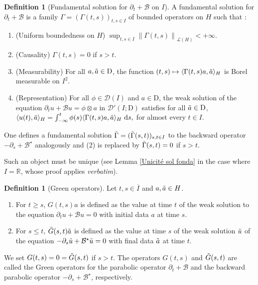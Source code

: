 \documentclass[11pt, letterpaper]{amsart}
\theoremstyle{definition}
\newtheorem{defn}[thm]{Definition}
\theoremstyle{remark}
\numberwithin{equation}{section}
\begin{document}
\begin{defn}[Fundamental solution for $\partial_t + \mathcal{B}$ on $I$] \label{FSintro}
    A fundamental solution for $\partial_t + \mathcal{B}$ is a family $\Gamma=(\Gamma(t,s))_{t,s \in I}$ of bounded operators on $H$ such that : 
    \begin{enumerate}
        \item (Uniform boundedness on $H$) $\sup_{t,s \in I} \left\|\Gamma(t,s) \right\|_{\mathcal{L}(H)} < +\infty.$
        \item (Causality) $\Gamma(t,s)=0$ if $s>t$.
        \item (Measurability) For all $a,\Tilde{a}\in  \mathrm{D}$, the function $(t,s) \mapsto \langle \Gamma(t,s)a, \Tilde{a} \rangle_H$ is Borel measurable on $I^2$.
        \item (Representation) For all $\phi \in \mathcal{D}(I)$ and $a \in  \mathrm{D}$, the weak solution of the equation $\partial_t u + \mathcal{B}u = \phi \otimes a $ in $\mathcal{D}'(I; \mathrm{D})$ satisfies for  all $\Tilde{a} \in  \mathrm{D}$,  $\langle u(t), \Tilde{a} \rangle_H = \int_{-\infty}^{t} \phi(s) \langle \Gamma (t,s)a, \Tilde{a} \rangle_H \ \mathrm{d}s,$ for almost every $t\in I$.
    \end{enumerate}
    One defines a fundamental solution $\Tilde{\Gamma}=(\Tilde{\Gamma}(s,t))_{s,t \in I}$ to the backward operator $-\partial_s + \mathcal{B}^\star$ analogously and (2) is replaced by $\Tilde{\Gamma}(s,t)=0$ if $s>t$. \end{defn}

Such an object must be unique (see Lemma \ref{Unicité sol fonda}  in the case where $I=\mathbb{R}$, whose proof applies \textit{verbatim}). 


\begin{defn}[Green operators]\label{def:Greenintro}
Let $t,s \in \overline{I}$ and $a,\Tilde{a} \in H$.
\begin{enumerate}
    \item For $t \ge s$, $G(t,s)a$ is defined as the value at time $t$ of the weak solution to the equation $\partial_t u + \mathcal{B}u = 0$ with initial data  $a$  at time $s$.
    \item For $s \le  t$, $\Tilde{G}(s,t)\Tilde{a}$ is defined as the value at time $s$ of the weak solution $\Tilde{u} $ of the equation $-\partial_s \Tilde{u} + \mathcal{B^\star}\Tilde{u} = 0$ with final data $ \Tilde{a}$ at time $t$. 
\end{enumerate}
We set $G(t,s)=0=\Tilde{G}(s,t)$ if $s>t$. 
The operators $G(t,s)$ and $\Tilde{G}(s,t)$ are called the Green operators for the parabolic operator $\partial_t +\mathcal{B}$ and the backward parabolic operator $ -\partial_s +\mathcal{B^\star}$, respectively.
\end{defn}
\end{document}
